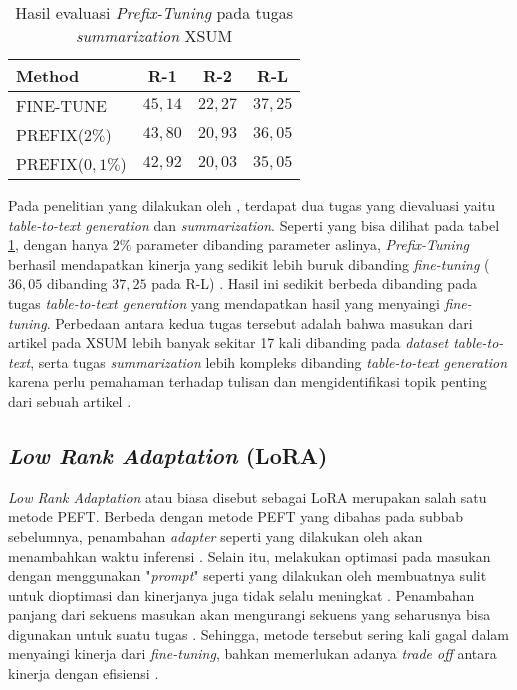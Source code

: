 \begin{table}[h]
    \vspace{0.25cm}
    \centering
    \caption{Hasil evaluasi \textit{Prefix-Tuning} pada tugas \textit{summarization} XSUM \parencite{prefix_tuning}}
    \label{table:prefix_tuning_result}
    \begin{tabular}{lccc}
        \toprule
        Method & R-1 & R-2 & R-L \\
        \midrule
        FINE-TUNE & $45,14$ & $22,27$ & $37,25$ \\
        PREFIX($2\%$) & $43,80$ & $20,93$ & $36,05$ \\
        PREFIX($0,1\%$) & $42,92$ & $20,03$ & $35,05$ \\
        \bottomrule
    \end{tabular}
\end{table}

Pada penelitian yang dilakukan oleh \citeauthor{prefix_tuning}, terdapat dua tugas yang dievaluasi yaitu \textit{table-to-text generation} dan \textit{summarization}. Seperti yang bisa dilihat pada tabel \ref{table:prefix_tuning_result}, dengan hanya $2\%$ parameter dibanding parameter aslinya, \textit{Prefix-Tuning} berhasil mendapatkan kinerja yang sedikit lebih buruk dibanding \textit{fine-tuning} ($36,05$ dibanding $37,25$ pada R-L) \parencite{prefix_tuning}. Hasil ini sedikit berbeda dibanding pada tugas \textit{table-to-text generation} yang mendapatkan hasil yang menyaingi \textit{fine-tuning}. Perbedaan antara kedua tugas tersebut adalah bahwa masukan dari artikel pada XSUM lebih banyak sekitar 17 kali dibanding pada \textit{dataset table-to-text}, serta tugas \textit{summarization} lebih kompleks dibanding \textit{table-to-text generation} karena perlu pemahaman terhadap tulisan dan mengidentifikasi topik penting dari sebuah artikel \parencite{prefix_tuning}.

\subsection{\textit{Low Rank Adaptation} (LoRA)}

\textit{Low Rank Adaptation} atau biasa disebut sebagai LoRA merupakan salah satu metode PEFT. Berbeda dengan metode PEFT yang dibahas pada subbab sebelumnya, penambahan \textit{adapter} seperti yang dilakukan oleh \citeauthor{adapter_houlsby} akan menambahkan waktu inferensi \parencite{lora}. Selain itu, melakukan optimasi pada masukan dengan menggunakan "\textit{prompt}" seperti yang dilakukan oleh \citeauthor{prefix_tuning} membuatnya sulit untuk dioptimasi dan kinerjanya juga tidak selalu meningkat \parencite{lora}. Penambahan panjang dari sekuens masukan akan mengurangi sekuens yang seharusnya bisa digunakan untuk suatu tugas \parencite{lora}. Sehingga, metode tersebut sering kali gagal dalam menyaingi kinerja dari \textit{fine-tuning}, bahkan memerlukan adanya \textit{trade off} antara kinerja dengan efisiensi \parencite{lora}.

